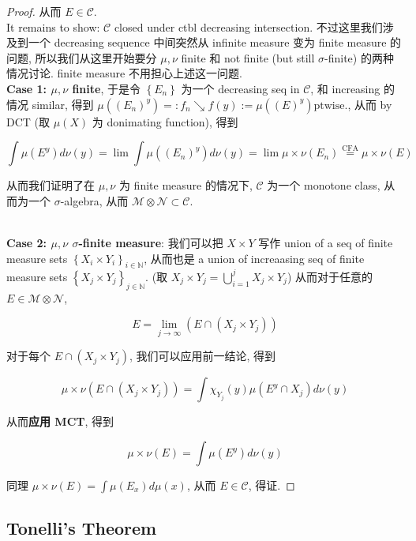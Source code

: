\begin{proof}
从而 \(E \in \mathcal{C}\).\\
It remains to show: \(\mathcal{C}\) closed under ctbl decreasing intersection. 不过这里我们涉及到一个 decreasing sequence 中间突然从 infinite measure 变为 finite measure 的问题, 所以我们从这里开始要分 \(\mu,\nu\) finite 和 not finite (but still \(\sigma\)-finite) 的两种情况讨论. finite measure 不用担心上述这一问题.\\
\textbf{Case 1: \(\mu,\nu\) finite}, 于是令 \(\left\{ E_{n} \right\}\) 为一个 decreasing seq in \(\mathcal{C}\), 和 increasing 的情况 similar, 得到 \(\mu((E_{n})^{y}) = :f_{n}\operatorname{\searrow }f(y) := \mu((E)^{y})\text{ptwise.}\), 从而 by DCT (取 \(\mu(X)\) 为 donimating function), 得到

\[\int\mu(E^{y}) d\nu(y) = \lim\int\mu((E_{n})^{y}) d\nu(y) = \lim\mu \times \nu(E_{n})\overset{\text{CFA}}{=}\mu \times \nu(E)\]

从而我们证明了在 \(\mu,\nu\) 为 finite measure 的情况下, \(\mathcal{C}\) 为一个 monotone class, 从而为一个 \(\sigma\)-algebra, 从而 \(\mathcal{M} \otimes \mathcal{N} \subset \mathcal{C}\).\\
\strut \\
\textbf{Case 2: \(\mu,\nu\) \(\sigma\)-finite measure}: 我们可以把 \(X \times Y\) 写作 union of a seq of finite measure sets \(\left\{ {X_{i} \times Y_{i}} \right\}_{i \in \mathbb{N}}\), 从而也是 a union of increaasing seq of finite measure sets \(\left\{ {X_{j} \times Y_{j}} \right\}_{j \in \mathbb{N}}\). (取 \(X_{j} \times Y_{j} = \bigcup_{i = 1}^{j}X_{j} \times Y_{j}\)) 从而对于任意的 \(E \in \mathcal{M} \otimes \mathcal{N}\),

\[E = \lim\limits_{j\rightarrow\infty}(E \cap (X_{j} \times Y_{j}))\]

对于每个 \(E \cap (X_{j} \times Y_{j})\), 我们可以应用前一结论, 得到

\[\mu \times \nu(E \cap (X_{j} \times Y_{j})) = \int\chi_{Y_{j}}(y)\mu(E^{y} \cap X_{j}) d\nu(y)\]

从而\textbf{应用 MCT}, 得到

\[\mu \times \nu(E) = \int\mu(E^{y}) d\nu(y)\]

同理 \(\mu \times \nu(E) = \int\mu(E_{x}) d\mu(x)\), 从而 \(E \in \mathcal{C}\), 得证.

\end{proof}

\subsection{Tonelli's Theorem}\label{tonellis-theorem}

